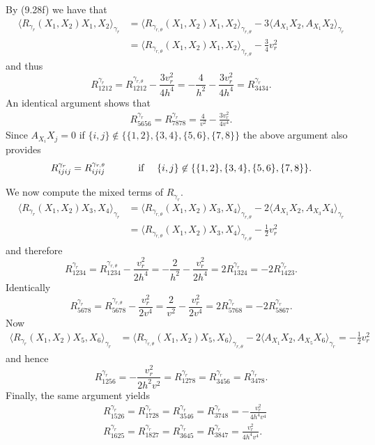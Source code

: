 \documentclass[10pt]{amsart}
\def\nin{\not \in}
\def\g{\gamma}
\def\la{\langle}
\def\ra{\rangle}
\def\th{\theta}
\theoremstyle{definition}
\theoremstyle{remark}
\numberwithin{equation}{section}
\begin{document}
By (9.28f) we have that
	\begin{align*}
	\la R_{\g_r}(X_1,X_2)X_1,X_2 \ra_{\g_r} &= \la R_{\g_{r, \th}}(X_1,X_2)X_1,X_2 \ra_{\g_{r, \th}} - 3 \la A_{X_1}X_2,A_{X_1}X_2 \ra_{\g_r}  \\
	&= \la R_{\g_{r, \th}}(X_1,X_2)X_1,X_2 \ra_{\g_{r, \th}} - \frac{3}{4} v_r^2
	\end{align*}
and thus
	\begin{equation}
	R^{\g_r}_{1212} = R^{\g_{r, \th}}_{1212} - \frac{3 v_r^2}{4h^4} = - \frac{4}{h^2} - \frac{3v_r^2}{4h^4} = R^{\g_r}_{3434}.
	\end{equation}
An identical argument shows that
	\begin{align}
	R^{\g_r}_{5656} = R^{\g_r}_{7878} = \frac{4}{v^2} - \frac{3v_r^2}{4v^4}.
	\end{align}
Since $A_{X_i}X_j = 0$ if $\{ i, j \} \nin \{ \{1, 2 \}, \{ 3, 4 \}, \{5, 6\}, \{7, 8 \} \}$ the above argument also provides
	\begin{equation}
	R^{\g_r}_{ijij} = R^{\g_{r, \th}}_{ijij}  \hskip 30pt \text{ if } \hskip 10pt  \{ i, j \} \nin \{ \{1, 2 \}, \{ 3, 4 \}, \{5, 6\}, \{7, 8 \} \}.
	\end{equation}
	
We now compute the mixed terms of $R_{\g_r}$.  
	\begin{align*}
	\la R_{\g_r}(X_1,X_2)X_3,X_4 \ra_{\g_r} &= \la R_{\g_{r, \th}}(X_1,X_2)X_3,X_4 \ra_{\g_{r, \th}} - 2 \la A_{X_1}X_2,A_{X_3}X_4 \ra_{\g_r}  \\
	&= \la R_{\g_{r, \th}}(X_1,X_2)X_3,X_4 \ra_{\g_{r, \th}} - \frac{1}{2} v_r^2
	\end{align*}
and therefore
	\begin{equation}
	R^{\g_r}_{1234} = R^{\g_{r, \th}}_{1234} - \frac{v_r^2}{2h^4} = - \frac{2}{h^2} - \frac{v_r^2}{2h^4} = 2 R^{\g_r}_{1324} = -2 R^{\g_r}_{1423}.
	\end{equation}
Identically
	\begin{equation}
	R^{\g_r}_{5678} = R^{\g_{r, \th}}_{5678} - \frac{v_r^2}{2v^4} = \frac{2}{v^2} - \frac{v_r^2}{2v^4} = 2 R^{\g_r}_{5768} = -2 R^{\g_r}_{5867}.
	\end{equation}
Now
	\begin{align*}
	\la R_{\g_r}(X_1,X_2)X_5,X_6 \ra_{\g_r} &= \la R_{\g_{r, \th}}(X_1,X_2)X_5,X_6 \ra_{\g_{r, \th}} - 2 \la A_{X_1}X_2,A_{X_5}X_6 \ra_{\g_r}  = - \frac{1}{2} v_r^2
	\end{align*}
and hence
	\begin{equation}
	R^{\g_r}_{1256} = - \frac{v_r^2}{2 h^2 v^2} = R^{\g_r}_{1278} = R^{\g_r}_{3456} = R^{\g_r}_{3478}.
	\end{equation}
Finally, the same argument yields
	\begin{align}
	&R^{\g_r}_{1526} = R^{\g_r}_{1728} = R^{\g_r}_{3546} = R^{\g_r}_{3748} = - \frac{v_r^2}{4h^4 v^4}  \\
	&R^{\g_r}_{1625} = R^{\g_r}_{1827} = R^{\g_r}_{3645} = R^{\g_r}_{3847} = \frac{v_r^2}{4h^4 v^4}.  \label{eqn:last eqn}
	\end{align}
	
\end{document}
